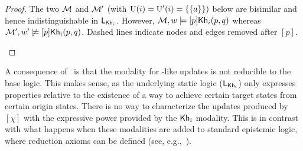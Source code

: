 \begin{proof}
  The two \ultss $\mathcal{M}$ and $\mathcal{M}'$ (with
  $\operatorname{U}(i)=\operatorname{U}'(i)=\{ \{ a \} \})$ below are bisimilar and hence
  indistinguishable in $\mathsf{L}_{{\sf Kh}_i}$. However, $\mathcal{M},w\models[p]{\sf Kh}_i(p,q)$ whereas
  $\mathcal{M}',w'\not\models[p]{\sf Kh}_i(p,q)$. Dashed lines indicate nodes and edges removed after $[p]$.

  \medskip 

\begin{center}
  \end{center}
\end{proof}

A consequence of~ is that the modality for \PAL-like updates is not reducible to the base logic. This makes sense, as the underlying static logic ($\mathsf{L}_{{\sf Kh}_i}$) only expresses properties relative to the existence of a way to achieve certain target states from certain origin states. There is no way to characterize the updates produced by $[\chi]$ with the expressive power provided by the ${\sf Kh}_i$ modality. This is in contrast with what happens when these modalities are added to standard epistemic logic, where reduction axioms can be defined (see, e.g.,~\cite{DELbook}).


